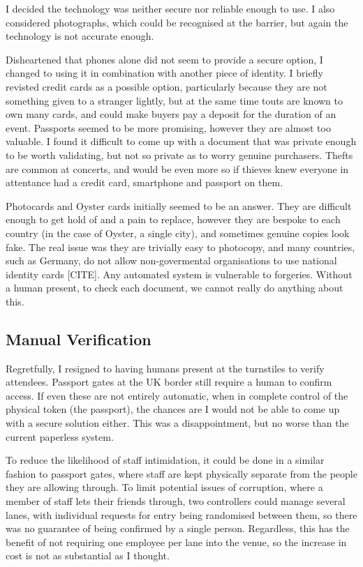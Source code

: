 \documentclass[12pt,a4]{bhamdissertation}
\begin{document}
I decided the technology was neither secure nor reliable enough to use. I also considered photographs, which could be recognised at the barrier, but again the technology is not accurate enough.

Disheartened that phones alone did not seem to provide a secure option, I changed to using it in combination with another piece of identity. I briefly revisted credit cards as a possible option, particularly because they are not something given to a stranger lightly, but at the same time touts are known to own many cards, and could make buyers pay a deposit for the duration of an event. Passports seemed to be more promising, however they are almost too valuable. I found it difficult to come up with a document that was private enough to be worth validating, but not so private as to worry genuine purchasers. Thefts are common at concerts, and would be even more so if thieves knew everyone in attentance had a credit card, smartphone and passport on them.

Photocards and Oyster cards initially seemed to be an answer. They are difficult enough to get hold of and a pain to replace, however they are bespoke to each country (in the case of Oyster, a single city), and sometimes genuine copies look fake. The real issue was they are trivially easy to photocopy, and many countries, such as Germany, do not allow non-govermental organisations to use national identity cards [CITE]. Any automated system is vulnerable to forgeries. Without a human present, to check each document, we cannot really do anything about this.

\subsection{Manual Verification}

Regretfully, I resigned to having humans present at the turnstiles to verify attendees. Passport gates at the UK border still require a human to confirm access. If even these are not entirely automatic, when in complete control of the physical token (the passport), the chances are I would not be able to come up with a secure solution either. This was a disappointment, but no worse than the current paperless system.

To reduce the likelihood of staff intimidation, it could be done in a similar fashion to passport gates, where staff are kept physically separate from the people they are allowing through. To limit potential issues of corruption, where a member of staff lets their friends through, two controllers could manage several lanes, with individual requests for entry being randomised between them, so there was no guarantee of being confirmed by a single person. Regardless, this has the benefit of not requiring one employee per lane into the venue, so the increase in cost is not as substantial as I thought.
\end{document}
